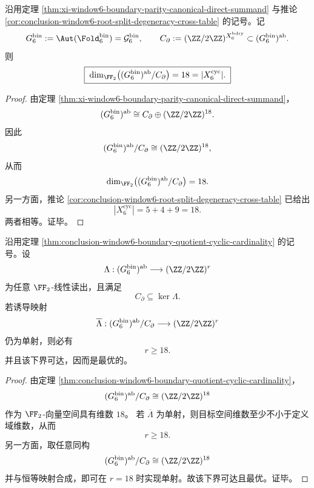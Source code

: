 \begin{theorem}\label{thm:conclusion-window6-boundary-quotient-cyclic-cardinality}
沿用定理 \ref{thm:xi-window6-boundary-parity-canonical-direct-summand} 与推论 \ref{cor:conclusion-window6-root-split-degeneracy-cross-table} 的记号。记
\[
G_6^{\mathrm{bin}}:=\Aut(\Fold_6^{\mathrm{bin}})=\mathcal G_6^{\mathrm{bin}},
\qquad
C_{\partial}:=(\ZZ/2\ZZ)^{X_6^{\mathrm{bdry}}}\subset (G_6^{\mathrm{bin}})^{\mathrm{ab}}.
\]
则
\[
\boxed{\;
\dim_{\FF_2}\bigl((G_6^{\mathrm{bin}})^{\mathrm{ab}}/C_{\partial}\bigr)
=
18
=
|X_6^{\mathrm{cyc}}|.\;}
\]
\end{theorem}
\begin{proof}
由定理 \ref{thm:xi-window6-boundary-parity-canonical-direct-summand}，
\[
(G_6^{\mathrm{bin}})^{\mathrm{ab}}
\cong
C_{\partial}\oplus(\ZZ/2\ZZ)^{18}.
\]
因此
\[
(G_6^{\mathrm{bin}})^{\mathrm{ab}}/C_{\partial}
\cong
(\ZZ/2\ZZ)^{18},
\]
从而
\[
\dim_{\FF_2}\bigl((G_6^{\mathrm{bin}})^{\mathrm{ab}}/C_{\partial}\bigr)=18.
\]
另一方面，推论 \ref{cor:conclusion-window6-root-split-degeneracy-cross-table} 已给出
\[
|X_6^{\mathrm{cyc}}|=5+4+9=18.
\]
两者相等。证毕。
\end{proof}

\begin{corollary}\label{cor:conclusion-window6-minimal-faithful-residual-budget-18}
沿用定理 \ref{thm:conclusion-window6-boundary-quotient-cyclic-cardinality} 的记号。设
\[
\Lambda:(G_6^{\mathrm{bin}})^{\mathrm{ab}}\longrightarrow (\ZZ/2\ZZ)^r
\]
为任意 \(\FF_2\)-线性读出，且满足
\[
C_{\partial}\subseteq \ker\Lambda.
\]
若诱导映射
\[
\overline{\Lambda}:(G_6^{\mathrm{bin}})^{\mathrm{ab}}/C_{\partial}
\longrightarrow
(\ZZ/2\ZZ)^r
\]
仍为单射，则必有
\[
\boxed{\;
r\ge 18.\;}
\]
并且该下界可达，因而是最优的。
\end{corollary}
\begin{proof}
由定理 \ref{thm:conclusion-window6-boundary-quotient-cyclic-cardinality}，
\[
(G_6^{\mathrm{bin}})^{\mathrm{ab}}/C_{\partial}\cong (\ZZ/2\ZZ)^{18}
\]
作为 \(\FF_2\)-向量空间具有维数 \(18\)。
若 \(\overline{\Lambda}\) 为单射，则目标空间维数至少不小于定义域维数，从而
\[
r\ge 18.
\]
另一方面，取任意同构
\[
(G_6^{\mathrm{bin}})^{\mathrm{ab}}/C_{\partial}\cong (\ZZ/2\ZZ)^{18}
\]
并与恒等映射合成，即可在 \(r=18\) 时实现单射。故该下界可达且最优。证毕。
\end{proof}

